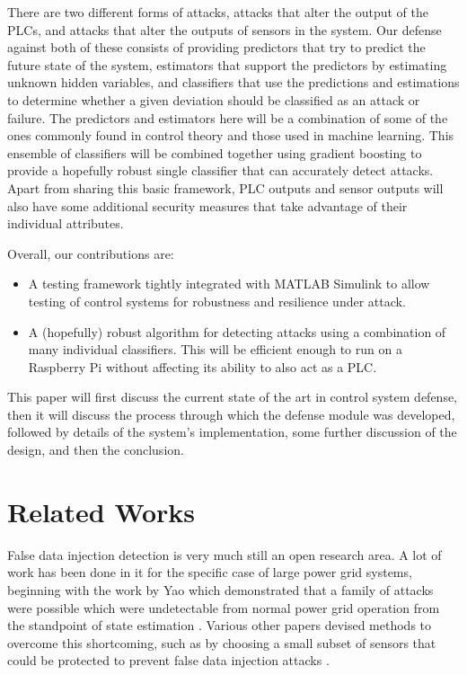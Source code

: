 \documentclass[10pt,twocolumn]{IEEEtran}
\begin{document}
There are two different forms of attacks, attacks that alter the output of the PLCs, and attacks that alter the outputs of sensors in the system.
Our defense against both of these consists of providing predictors that try to predict the future state of the system, estimators that support the predictors by estimating unknown hidden variables, and classifiers that use the predictions and estimations to determine whether a given deviation should be classified as an attack or failure.
The predictors and estimators here will be a combination of some of the ones commonly found in control theory and those used in machine learning.
This ensemble of classifiers will be combined together using gradient boosting to provide a hopefully robust single classifier that can accurately detect attacks.
Apart from sharing this basic framework, PLC outputs and sensor outputs will also have some additional security measures that take advantage of their individual attributes.

Overall, our contributions are:
\begin{itemize}
\item A testing framework tightly integrated with MATLAB Simulink to allow testing of control systems for robustness and resilience under attack.
\item A (hopefully) robust algorithm for detecting attacks using a combination of many individual classifiers.
  This will be efficient enough to run on a Raspberry Pi without affecting its ability to also act as a PLC.
\end{itemize}

This paper will first discuss the current state of the art in control system defense, then it will discuss the process through which the defense module was developed, followed by details of the system's implementation, some further discussion of the design, and then the conclusion.

\section{Related Works} \label{sec:related}
False data injection detection is very much still an open research area.
A lot of work has been done in it for the specific case of large power grid systems, beginning with the work by Yao which demonstrated that a family of attacks were possible which were undetectable from normal power grid operation from the standpoint of state estimation \cite{liu2011false}.
Various other papers devised methods to overcome this shortcoming, such as by choosing a small subset of sensors that could be protected to prevent false data injection attacks \cite{bobba2010detecting}.
\end{document}
